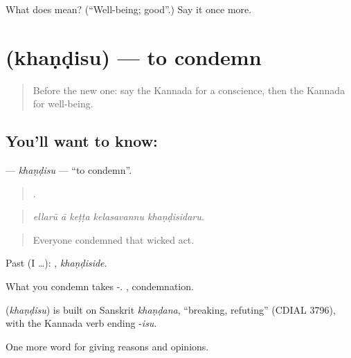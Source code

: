 \begin{tcolorbox}[breakable,colback=teal!4,colframe=teal!35!black,title={Before you move on}]
What does  mean? (\textquotedblleft{}Well-being; good\textquotedblright{}.) Say it once more.
\end{tcolorbox}
\section[\texorpdfstring{\kn{ಖಂಡಿಸು} (khaṇḍisu)}{ಖಂಡಿಸು (khaṇḍisu)}]{ (khaṇḍisu) — to condemn}

\label{lesson:KA-C388-khandisu}



\begin{quote}
Before the new one: say the Kannada for a conscience, then the Kannada for well-being.
\end{quote}

\subsection*{You'll want to know: }
\textbf{} — \emph{khaṇḍisu} — \textquotedblleft{}to condemn\textquotedblright{}.

\begin{quote}
    .
\end{quote}

\begin{quote}
\emph{ellarū ā keṭṭa kelasavannu khaṇḍisidaru.}
\end{quote}

\begin{quote}
Everyone condemned that wicked act.
\end{quote}

Past (I …): , \emph{khaṇḍiside}.

What you condemn takes -. , condemnation.

\begin{cousinweb}
\textbf{} (\emph{khaṇḍisu}) is built on Sanskrit \emph{khaṇḍana}, \textquotedblleft{}breaking, refuting\textquotedblright{} (CDIAL 3796), with the Kannada verb ending -\emph{isu}.
\end{cousinweb}

\begin{grammarlens}[title={What you've built}]
One more word for giving reasons and opinions.
\end{grammarlens}

